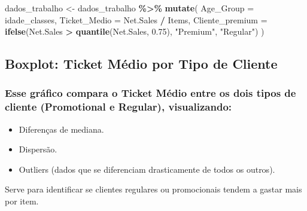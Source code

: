 \documentclass[
]{article}
\newenvironment{Shaded}{\begin{snugshade}}{\end{snugshade}}
\newcommand{\AttributeTok}[1]{\textcolor[rgb]{0.13,0.29,0.53}{#1}}
\newcommand{\FloatTok}[1]{\textcolor[rgb]{0.00,0.00,0.81}{#1}}
\newcommand{\FunctionTok}[1]{\textcolor[rgb]{0.13,0.29,0.53}{\textbf{#1}}}
\newcommand{\NormalTok}[1]{#1}
\newcommand{\OtherTok}[1]{\textcolor[rgb]{0.56,0.35,0.01}{#1}}
\newcommand{\SpecialCharTok}[1]{\textcolor[rgb]{0.81,0.36,0.00}{\textbf{#1}}}
\newcommand{\StringTok}[1]{\textcolor[rgb]{0.31,0.60,0.02}{#1}}
\begin{document}
\begin{Shaded}
\begin{Highlighting}[]
\NormalTok{dados\_trabalho }\OtherTok{\textless{}{-}}\NormalTok{ dados\_trabalho }\SpecialCharTok{\%\textgreater{}\%} 
  \FunctionTok{mutate}\NormalTok{(}
    \AttributeTok{Age\_Group =}\NormalTok{ idade\_classes,  }
    \AttributeTok{Ticket\_Medio =}\NormalTok{ Net.Sales }\SpecialCharTok{/}\NormalTok{ Items,}
    \AttributeTok{Cliente\_premium =} \FunctionTok{ifelse}\NormalTok{(Net.Sales }\SpecialCharTok{\textgreater{}} \FunctionTok{quantile}\NormalTok{(Net.Sales, }\FloatTok{0.75}\NormalTok{), }\StringTok{"Premium"}\NormalTok{, }\StringTok{"Regular"}\NormalTok{)}
\NormalTok{  )}
\end{Highlighting}
\end{Shaded}

\subsection{Boxplot: Ticket Médio por Tipo de
Cliente}\label{boxplot-ticket-muxe9dio-por-tipo-de-cliente}

\subsubsection{Esse gráfico compara o Ticket Médio entre os dois tipos
de cliente (Promotional e Regular),
visualizando:}\label{esse-gruxe1fico-compara-o-ticket-muxe9dio-entre-os-dois-tipos-de-cliente-promotional-e-regular-visualizando}

\begin{itemize}
\item
  Diferenças de mediana.
\item
  Dispersão.
\item
  Outliers (dados que se diferenciam drasticamente de todos os outros).
\end{itemize}

Serve para identificar se clientes regulares ou promocionais tendem a
gastar mais por item.

\begin{Shaded}
\end{Shaded}
\end{document}
